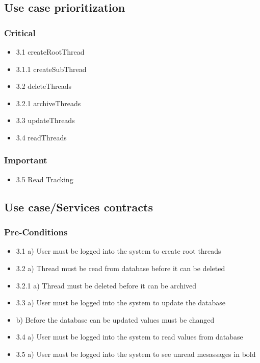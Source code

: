 \documentclass[hidelinks, 12pt, oneside]{article}
\begin{document}
\subsection{Use case prioritization}
\subsubsection{Critical}
\begin{itemize}
  \item 3.1 createRootThread
  \item 3.1.1 createSubThread
  \item 3.2 deleteThreads
  \item 3.2.1 archiveThreads
  \item 3.3 updateThreads
  \item 3.4 readThreads
\end{itemize}
\subsubsection{Important}
 \begin{itemize}
  \item 3.5 Read Tracking
 \end{itemize}

\subsection{Use case/Services contracts}
\subsubsection{Pre-Conditions}								%
\begin{itemize}
  \item 3.1 a) User must be logged into the system to create root threads
  \item 3.2 a) Thread must be read from database before it can be deleted
  \item 3.2.1 a) Thread must be deleted before it can be archived
  \item 3.3 a) User must be logged into the system to update the database
  \item     b) Before the database can be updated values must be changed
  \item 3.4 a) User must be logged into the system to read values from database
  \item 3.5 a) User must be logged into the system to see unread mesassages in bold
\end{itemize}
\end{document}

